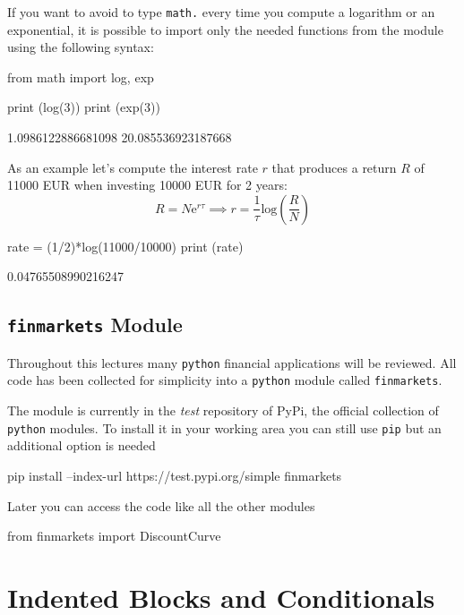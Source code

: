 If you want to avoid to type \texttt{math.} every time you compute a logarithm or an exponential, it is possible to import only the needed functions from the module using the following syntax:

\begin{ipythonnon}
from math import log, exp

print (log(3))
print (exp(3))
\end{ipythonnon}
\begin{ioutput}
1.0986122886681098
20.085536923187668	
\end{ioutput}

As an example let's compute the interest rate $r$ that produces a return $R$ of 11000 EUR when investing 10000 EUR for 2 years:
\begin{equation*}
R = N\mathrm{e}^{r\tau} \implies r = \frac{1}{\tau} \mathrm{log}(\frac{R}{N})
\end{equation*}

\begin{ipythonnon}
rate = (1/2)*log(11000/10000)
print (rate)
\end{ipythonnon}
\begin{ioutput}
0.04765508990216247	
\end{ioutput}

\subsection{\texttt{finmarkets} Module}

Throughout this lectures many \texttt{python} financial applications will be reviewed. All code has been collected for simplicity into a \texttt{python} module called \texttt{finmarkets}. 

The module is currently in the \emph{test} repository of PyPi, the official collection of \texttt{python} modules. To install it in your working area you can still use \texttt{pip} but an additional option is needed 
\begin{ioutput}
pip install --index-url https://test.pypi.org/simple finmarkets
\end{ioutput}
	
Later you can access the code like all the other modules

\begin{ipythonnon}
from finmarkets import DiscountCurve
\end{ipythonnon}

\section{Indented Blocks and Conditionals}
\label{indented-blocks-and-the-ttifelse-statement}

